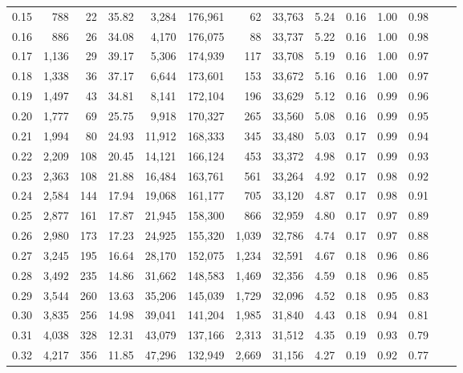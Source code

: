 \begin{tabular}{rrrrrrrrrrrrrr}
0.15 &    788 &   22 &   35.82 &    3,284 &  176,961 &      62 &  33,763 &  5.24 &  0.16 &  1.00 &      0.98 \\
0.16 &    886 &   26 &   34.08 &    4,170 &  176,075 &      88 &  33,737 &  5.22 &  0.16 &  1.00 &      0.98 \\
0.17 &  1,136 &   29 &   39.17 &    5,306 &  174,939 &     117 &  33,708 &  5.19 &  0.16 &  1.00 &      0.97 \\
0.18 &  1,338 &   36 &   37.17 &    6,644 &  173,601 &     153 &  33,672 &  5.16 &  0.16 &  1.00 &      0.97 \\
0.19 &  1,497 &   43 &   34.81 &    8,141 &  172,104 &     196 &  33,629 &  5.12 &  0.16 &  0.99 &      0.96 \\
0.20 &  1,777 &   69 &   25.75 &    9,918 &  170,327 &     265 &  33,560 &  5.08 &  0.16 &  0.99 &      0.95 \\
0.21 &  1,994 &   80 &   24.93 &   11,912 &  168,333 &     345 &  33,480 &  5.03 &  0.17 &  0.99 &      0.94 \\
0.22 &  2,209 &  108 &   20.45 &   14,121 &  166,124 &     453 &  33,372 &  4.98 &  0.17 &  0.99 &      0.93 \\
0.23 &  2,363 &  108 &   21.88 &   16,484 &  163,761 &     561 &  33,264 &  4.92 &  0.17 &  0.98 &      0.92 \\
0.24 &  2,584 &  144 &   17.94 &   19,068 &  161,177 &     705 &  33,120 &  4.87 &  0.17 &  0.98 &      0.91 \\
0.25 &  2,877 &  161 &   17.87 &   21,945 &  158,300 &     866 &  32,959 &  4.80 &  0.17 &  0.97 &      0.89 \\
0.26 &  2,980 &  173 &   17.23 &   24,925 &  155,320 &   1,039 &  32,786 &  4.74 &  0.17 &  0.97 &      0.88 \\
0.27 &  3,245 &  195 &   16.64 &   28,170 &  152,075 &   1,234 &  32,591 &  4.67 &  0.18 &  0.96 &      0.86 \\
0.28 &  3,492 &  235 &   14.86 &   31,662 &  148,583 &   1,469 &  32,356 &  4.59 &  0.18 &  0.96 &      0.85 \\
0.29 &  3,544 &  260 &   13.63 &   35,206 &  145,039 &   1,729 &  32,096 &  4.52 &  0.18 &  0.95 &      0.83 \\
0.30 &  3,835 &  256 &   14.98 &   39,041 &  141,204 &   1,985 &  31,840 &  4.43 &  0.18 &  0.94 &      0.81 \\
0.31 &  4,038 &  328 &   12.31 &   43,079 &  137,166 &   2,313 &  31,512 &  4.35 &  0.19 &  0.93 &      0.79 \\
0.32 &  4,217 &  356 &   11.85 &   47,296 &  132,949 &   2,669 &  31,156 &  4.27 &  0.19 &  0.92 &      0.77 \\

\end{tabular}

